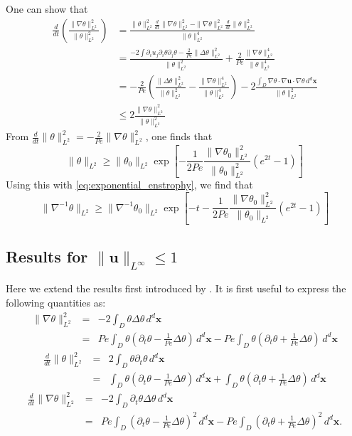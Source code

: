 \documentclass{jfm}
\newcommand{\ddt}[1]{\frac{d #1}{dt}}
\newcommand{\hmone}[1]{\|\nabla^{-1} #1\|_{L^{2}}}
\newcommand{\ltwo}[1]{\|#1\|_{L^{2}}}
\newcommand{\hone}[1]{\| \nabla #1\|_{L^{2}}}
\newcommand{\sint}[1]{\int_{D} #1 \, d^{d}\mathbf{x}}
\renewcommand{\vec}[1]{\mathbf{#1}}
\newcommand{\linf}[1]{\| #1 \|_{L^{\infty}}}
\renewcommand{\u}{\mathbf{u}}
\newcommand{\ppt}[1]{\partial_{t} #1}
\newcommand{\lap}{\Delta }
\begin{document}
One can show that 
%
\begin{subequations}
\begin{align}
\frac{d}{dt}\left(\frac{\|\nabla\theta\|_{L^{2}}^2}{\|\theta\|_{L^{2}}^2}\right) &= \frac{\|\theta\|_{L^{2}}^2\frac{d}{dt}\|\nabla\theta\|_{L^{2}}^2-\|\nabla\theta\|_{L^{2}}^2\frac{d}{dt}\|\theta\|_{L^{2}}^2}{\|\theta\|_{L^{2}}^4}\\
&= \frac{-2\int \partial_{i}u_{j}\partial_{i}\theta\partial_{j}\theta - \frac{2}{Pe} \|\Delta\theta\|_{L^{2}}^2}{\|\theta\|_{L^{2}}^2}+\frac{2}{Pe}\frac{\|\nabla\theta\|_{L^{2}}^4}{\|\theta\|_{L^{2}}^4} \\
&=-\frac{2}{Pe}\left(\frac{\|\Delta\theta\|_{L^{2}}^2}{\|\theta\|_{L^{2}}^2} - \frac{\|\nabla\theta\|_{L^{2}}^4}{\|\theta\|_{L^{2}}^4} \right) - 2\frac{\sint{\nabla\theta \cdot \nabla\vec{u} \cdot 
							\nabla\theta  }}{\|\theta\|_{L^{2}}^2} 
\\
&\leq 2 \frac{\hone{\theta}^2}{\ltwo{\theta}^2}
\end{align}
\end{subequations}
%
From $\ddt{}\ltwo{\theta}^2 = -\frac{2}{Pe} \hone{\theta}^2$, one finds that 
\begin{equation}
\ltwo{\theta}\geq  \ltwo{\theta_{0}}\exp\left[-\frac{1}{2Pe}\frac{\hone{\theta_{0}}^2}{\ltwo{\theta_{0}}^2}\left(e^{2 t} -1\right)\right]
\end{equation}
Using this with \eqref{eq:exponential_enstrophy}, we find that 
\begin{equation}
\hmone{\theta} \geq  \hmone{\theta_{0}} \exp\left[- t -\frac{1}{2 Pe}\frac{\hone{\theta_{0}}^2}{\ltwo{\theta_{0}}}\left(e^{2 t} -1\right)\right]
\end{equation}

\subsection{Results for $\linf{\u}\leq 1$}
Here we extend the results first introduced by \cite{Chi-Cheu1996}.  It is first useful to express the following quantities as:
%
\begin{eqnarray}
	 \hone{\theta}^2 &=& - 2\sint{\theta \lap \theta} \\
	 							&=& Pe \sint{\theta\left(\ppt{\theta}
	 									-\frac{1}{Pe}\lap \theta\right)} 
	 									-Pe \sint{\theta\left(\ppt{\theta}
	 									+\frac{1}{Pe}\lap \theta\right)} 
\end{eqnarray}
%
\begin{eqnarray}
	\ddt{}\ltwo{\theta}^2 &=& 2\sint{\theta\ppt{\theta}} \\
										 &=&\sint{\theta\left(\ppt{\theta}
	 									-\frac{1}{Pe}\lap \theta\right)} 
										 + \sint{\theta\left(\ppt{\theta}
	 									+\frac{1}{Pe}\lap \theta\right)} 
\end{eqnarray}
%
\begin{eqnarray}
	\ddt{}\hone{\theta}^2 &=& -2\sint{\ppt{\theta}\lap \theta} \\
	 									&=& Pe \sint{\left(\ppt{\theta}
	 									-\frac{1}{Pe}\lap \theta\right)^2} 
	 									-Pe \sint{\left(\ppt{\theta}
	 									+\frac{1}{Pe}\lap \theta\right)^2} .
\end{eqnarray}
\end{document}
